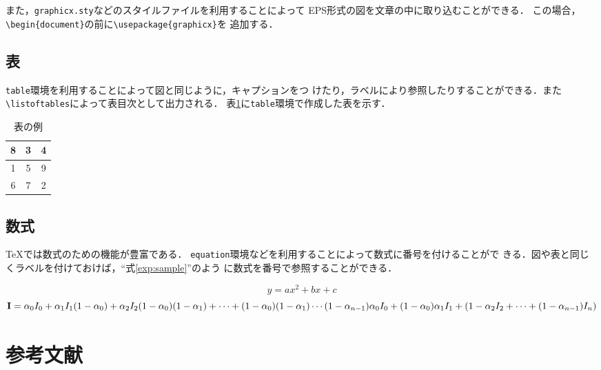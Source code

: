 \documentclass[11pt]{jreport}
\begin{document}
また，{\tt graphicx.sty}などのスタイルファイルを利用することによって
EPS形式の図を文章の中に取り込むことができる．
この場合，\verb|\begin{document}|の前に\verb|\usepackage{graphicx}|を
追加する．

\section{表}

{\tt table}環境を利用することによって図と同じように，キャプションをつ
けたり，ラベルにより参照したりすることができる．また
\verb|\listoftables|によって表目次として出力される．
表\ref{tab:sample}に{\tt table}環境で作成した表を示す．

\begin{table}
  \caption{表の例}
  \label{tab:sample}
  \begin{center}
    \begin{tabular}{|c|c|c|}
      \hline
      8 & 3 & 4\\
      \hline
      1 & 5 & 9 \\
      \hline
      6 & 7 & 2 \\
      \hline
    \end{tabular}
  \end{center}
\end{table}

\section{数式}

\TeX では数式のための機能が豊富である．
{\tt equation}環境などを利用することによって数式に番号を付けることがで
きる．図や表と同じくラベルを付けておけば，``式\ref{exp:sample}''のよう
に数式を番号で参照することができる．

\begin{equation}
  y = ax^2 + bx + c \label{exp:sample}
\end{equation}
\begin{equation}
   {\bf I} =\alpha_{0}I_{0}+\alpha_{1}I_{1}(1-\alpha_{0})+\alpha_{2}I_{2}(1-\alpha_{0})(1-\alpha_{1})+\cdots+(1-\alpha_{0})(1-\alpha_{1})\cdots(1-\alpha_{n-1})\alpha_{0}I_{0}+(1-\alpha_{0}){\alpha_{1}I_{1}+(1-\alpha_{2}I_{2}+\cdots+(1-\alpha_{n-1})I_{n})} \label{exp:alpha1}
\end{equation} 

\chapter{参考文献}
\end{document}
